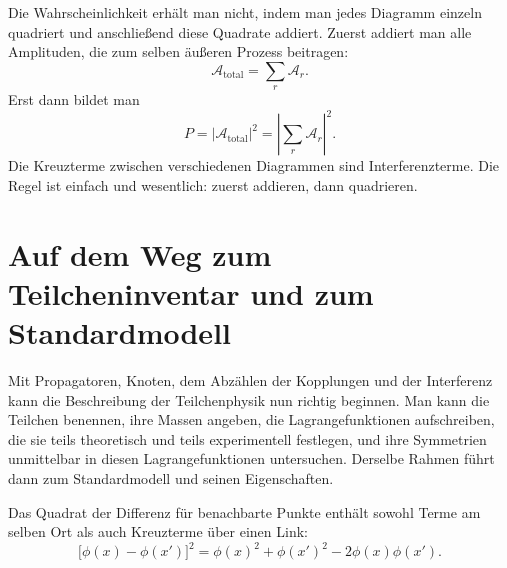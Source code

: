 Die Wahrscheinlichkeit erhält man nicht, indem man jedes Diagramm einzeln quadriert und anschließend diese Quadrate addiert. Zuerst addiert man alle Amplituden, die zum selben äußeren Prozess beitragen:
\begin{equation}
\mathcal{A}_{\mathrm{total}}=\sum_r\mathcal{A}_r.
\end{equation}
Erst dann bildet man
\begin{equation}
P=\left|\mathcal{A}_{\mathrm{total}}\right|^2
=\left|\sum_r\mathcal{A}_r\right|^2.
\end{equation}
Die Kreuzterme zwischen verschiedenen Diagrammen sind Interferenzterme. Die Regel ist einfach und wesentlich: zuerst addieren, dann quadrieren.

\section{Auf dem Weg zum Teilcheninventar und zum Standardmodell}

Mit Propagatoren, Knoten, dem Abzählen der Kopplungen und der Interferenz kann die Beschreibung der Teilchenphysik nun richtig beginnen. Man kann die Teilchen benennen, ihre Massen angeben, die Lagrangefunktionen aufschreiben, die sie teils theoretisch und teils experimentell festlegen, und ihre Symmetrien unmittelbar in diesen Lagrangefunktionen untersuchen. Derselbe Rahmen führt dann zum Standardmodell und seinen Eigenschaften.

\begin{classroomqa}
\end{classroomqa}

\begin{classroomqa}
\end{classroomqa}

Das Quadrat der Differenz für benachbarte Punkte enthält sowohl Terme am selben Ort als auch Kreuzterme über einen Link:
\begin{equation}
\bigl[\phi(x)-\phi(x')\bigr]^2
=
\phi(x)^2+\phi(x')^2-2\phi(x)\phi(x').
\end{equation}

\begin{classroomqa}
\end{classroomqa}
